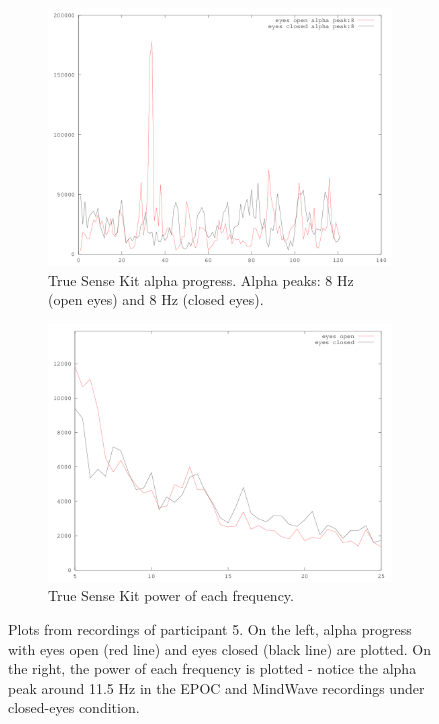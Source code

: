 \documentclass[a4paper,10pt,english,lof,lot,twoside]{puthesis}
\begin{document}
\begin{figure}
\begin{subfigure}[t]{0.49\linewidth}
\includegraphics[width=1.000\linewidth]{experiment-final-13-truesense-alpha-progress.png}
\caption[True Sense Kit alpha progress.]{True Sense Kit alpha progress. Alpha peaks: 8 Hz (open eyes) and 8 Hz (closed eyes).}\label{ch-experiment/index:fig-experiment-final-13-truesense-alpha-progress}\end{subfigure}
\begin{subfigure}[t]{0.49\linewidth}
\centering
\capstart

\includegraphics[width=1.000\linewidth]{experiment-final-13-truesense-pwelch-power.png}
\caption[True Sense Kit power of each frequency.]{True Sense Kit power of each frequency.}\label{ch-experiment/index:fig-experiment-final-13-truesense-alpha-power}\end{subfigure}
\caption[Experiment recording 1]{Plots from recordings of participant 5. On the left, alpha progress
with eyes open (red line) and eyes closed (black line) are plotted. On the right,
the power of each
frequency is plotted - notice the alpha peak around 11.5 Hz in the EPOC and MindWave
recordings under closed-eyes condition.}\label{ch-experiment/index:fig-final-experiment-recording-13}

\end{figure}
\end{document}

